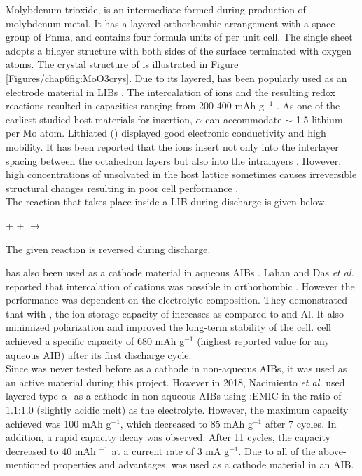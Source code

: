 Molybdenum trioxide,  is an intermediate formed during production of molybdenum metal. It has a layered orthorhombic arrangement with a space group of Pnma, and contains four formula units of  per unit cell. The single sheet adopts a bilayer structure with both sides of the surface terminated with oxygen atoms. The crystal structure of  is illustrated in Figure \ref{Figures/chap6fig:MoO3crys}. Due to its layered,  has been popularly used as an electrode material in LIBs \cite{wu_mixed_2017,li_vap,tsumura}. The intercalation of  ions and the resulting redox reactions resulted in capacities ranging from 200-400 mAh g$^{-1}$ \cite{tsumura,chen_fast,zhou_-moo3_2010}. As one of the earliest studied host materials for  insertion, $\alpha$  can accommodate $\sim$ 1.5 lithium per Mo atom. Lithiated  () displayed good electronic conductivity and high  mobility. It has been reported that the  ions insert not only into the interlayer spacing between the  octahedron layers but also into the  intralayers \cite{li_vap,chen_fast}. However, high concentrations of unsolvated  in the host lattice sometimes causes irreversible structural changes resulting in poor cell performance \cite{tao_moo3_2011,li_theoretical_2014}.\\
The reaction that takes place inside a LIB during discharge is given below. 

\begin{center}
     +  +  $\longrightarrow$  \cite{li_vap}
\end{center}

The given reaction is reversed during discharge.

 has also been used as a cathode material in aqueous AIBs \cite{joseph_hexagonal, shakir_structural_2010, lahan_al3+_2019, lahan_active_2018}. Lahan and Das \textit{et al.} reported that intercalation of  cations was possible in orthorhombic . However the performance was dependent on the electrolyte composition. They demonstrated that with , the  ion storage capacity of  increases as compared to  and Al. It also minimized polarization and improved the long-term stability of the cell.  cell achieved a specific capacity of 680 mAh g$^{-1}$ (highest reported value for any aqueous AIB) after its first discharge cycle. \\ 
Since  was never tested before as a cathode in non-aqueous AIBs, it was used as an active material during this project. However in 2018, Nacimiento \textit{et al.} used layered-type $\alpha$- as a cathode in non-aqueous AIBs using :EMIC in the ratio of 1.1:1.0 (slightly acidic melt) as the electrolyte. However, the maximum capacity achieved was 100 mAh g$^{-1}$, which decreased to 85 mAh g$^{-1}$ after 7 cycles. In addition, a rapid capacity decay was observed. After 11 cycles, the capacity decreased to 40 mAh $^{-1}$ at a current rate of 3 mA g$^{-1}$. Due to all of the above-mentioned properties and advantages,  was used as a cathode material in an AIB. 

